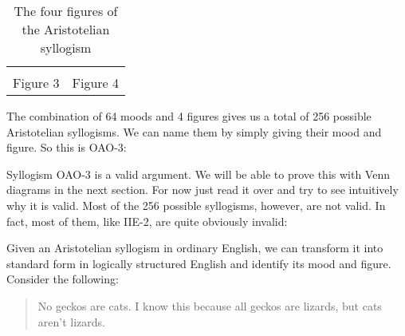 \begin{table}[!ht]
\begin{tabu}{X[1,c] X[1,c]}
&

\begin{kormanize}
\end{kormanize}

\\

\hspace{2em} Figure 3

&

\hspace{2em} Figure 4

\end{tabu}

\caption{The four figures of the Aristotelian syllogism}
\label{tab:four_figures}
\end{table}

The combination of 64 moods and 4 figures gives us a total of 256 possible Aristotelian syllogisms. We can name them by simply giving their mood and figure. So this is OAO-3:

\begin{kormanize}
\end{kormanize}

Syllogism OAO-3 is a valid argument. We will be able to prove this with Venn diagrams in the next section. For now just read it over and try to see intuitively why it is valid. Most of the 256 possible syllogisms, however, are not valid.  In fact, most of them, like IIE-2, are quite obviously invalid:

\begin{kormanize}
\end{kormanize}

Given an Aristotelian syllogism in ordinary English, we can transform it into standard form in logically structured English and identify its mood and figure. Consider the following:

\begin{quotation}
\noindent No geckos are cats. I know this because all geckos are lizards, but cats aren't lizards.
\end{quotation}

